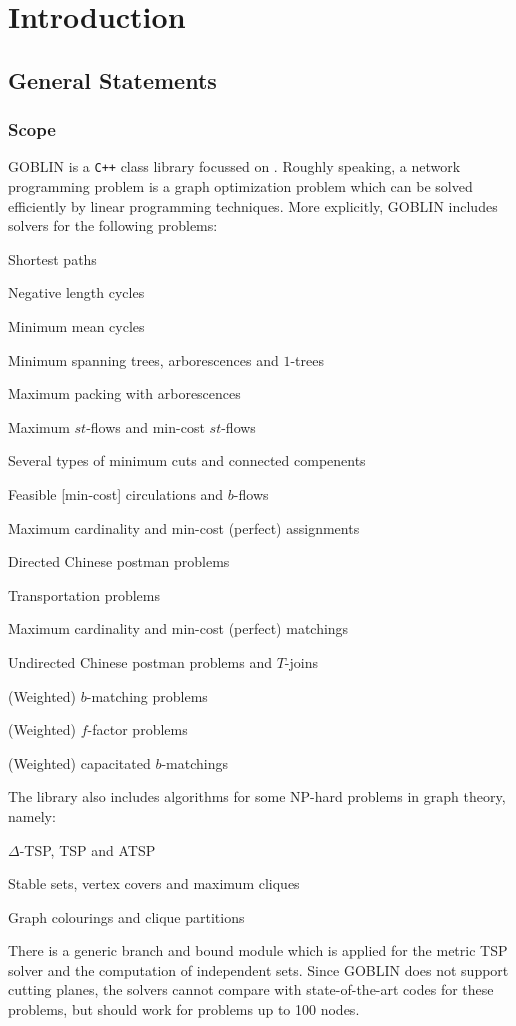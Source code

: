 \documentclass[a4paper,11pt,twoside]{book}
\begin{document}
\part{Introduction}
\thispagestyle{empty}
\begin{multicols}{2}
\pagestyle{fancy}

\chapter{General Statements}
\thispagestyle{fancy}
\section{Scope}

GOBLIN is a \verb/C++/ class library focussed on . Roughly speaking, a network programming problem is a graph
optimization problem which can be solved efficiently by linear programming
techniques. More explicitly, GOBLIN includes solvers for the following
problems:
\begin{myitemize}
\item Shortest paths
\item Negative length cycles
\item Minimum mean cycles
\item Minimum spanning trees, arborescences and $1$-trees
\item Maximum packing with arborescences
\item Maximum $st$-flows and min-cost $st$-flows
\item Several types of minimum cuts and connected compenents
\item Feasible [min-cost] circulations and $b$-flows
\item Maximum cardinality  and min-cost (perfect) assignments
\item Directed Chinese postman problems
\item Transportation problems
\item Maximum cardinality and min-cost (perfect) matchings
\item Undirected Chinese postman problems and $T$-joins
\item (Weighted) $b$-matching problems
\item (Weighted) $f$-factor problems
\item (Weighted) capacitated $b$-matchings
\end{myitemize}
The library also includes algorithms for some NP-hard problems in graph theory,
namely:
\begin{myitemize}
\item $\Delta$-TSP, TSP and ATSP
\item Stable sets, vertex covers and maximum cliques
\item Graph colourings and clique partitions
\end{myitemize}
There is a generic branch and bound module which is applied for the metric TSP solver
and the computation of independent sets. Since GOBLIN does not support cutting planes, the solvers
cannot compare with state-of-the-art codes for these problems, but should work for
problems up to 100 nodes. 


\end{multicols}
\end{document}
